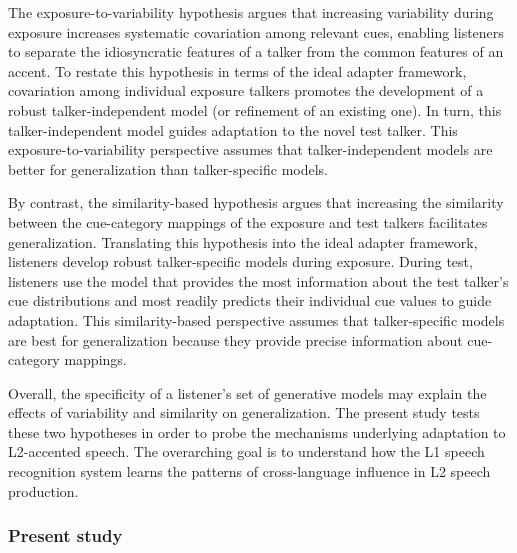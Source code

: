 \documentclass[
  12pt,
  twoside]{article}
\begin{document}
The exposure-to-variability hypothesis argues that increasing variability during exposure increases systematic covariation among relevant cues, enabling listeners to separate the idiosyncratic features of a talker from the common features of an accent.
To restate this hypothesis in terms of the ideal adapter framework, covariation among individual exposure talkers promotes the development of a robust talker-independent model (or refinement of an existing one).
In turn, this talker-independent model guides adaptation to the novel test talker.
This exposure-to-variability perspective assumes that talker-independent models are better for generalization than talker-specific models.

By contrast, the similarity-based hypothesis argues that increasing the similarity between the cue-category mappings of the exposure and test talkers facilitates generalization.
Translating this hypothesis into the ideal adapter framework, listeners develop robust talker-specific models during exposure.
During test, listeners use the model that provides the most information about the test talker's cue distributions and most readily predicts their individual cue values to guide adaptation.
This similarity-based perspective assumes that talker-specific models are best for generalization because they provide precise information about cue-category mappings.

Overall, the specificity of a listener's set of generative models may explain the effects of variability and similarity on generalization.
The present study tests these two hypotheses in order to probe the mechanisms underlying adaptation to L2-accented speech.
The overarching goal is to understand how the L1 speech recognition system learns the patterns of cross-language influence in L2 speech production.

\hypertarget{present-study}{%
\subsubsection{Present study}\label{present-study}}
\end{document}
